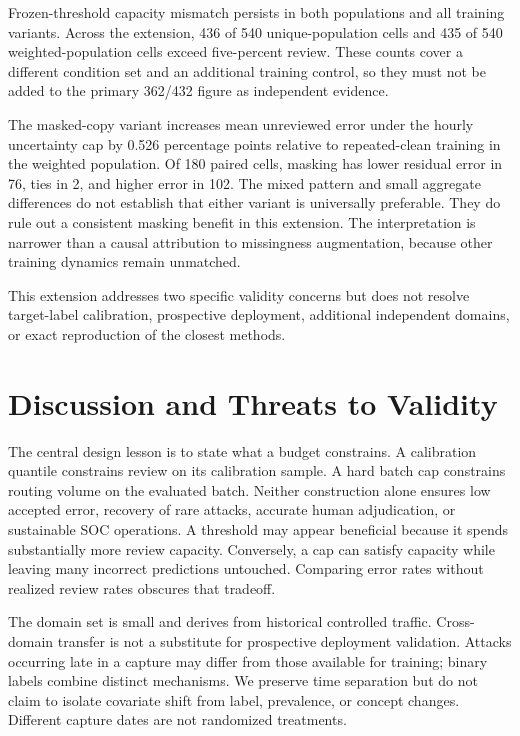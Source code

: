\documentclass[manuscript,screen,nonacm]{acmart}
\begin{document}
Frozen-threshold capacity mismatch persists in both populations and all training variants. Across the extension, 436 of 540 unique-population cells and 435 of 540 weighted-population cells exceed five-percent review. These counts cover a different condition set and an additional training control, so they must not be added to the primary 362/432 figure as independent evidence.

The masked-copy variant increases mean unreviewed error under the hourly uncertainty cap by 0.526 percentage points relative to repeated-clean training in the weighted population. Of 180 paired cells, masking has lower residual error in 76, ties in 2, and higher error in 102. The mixed pattern and small aggregate differences do not establish that either variant is universally preferable. They do rule out a consistent masking benefit in this extension. The interpretation is narrower than a causal attribution to missingness augmentation, because other training dynamics remain unmatched.

This extension addresses two specific validity concerns but does not resolve target-label calibration, prospective deployment, additional independent domains, or exact reproduction of the closest methods.

\section{Discussion and Threats to Validity}
The central design lesson is to state what a budget constrains. A calibration quantile constrains review on its calibration sample. A hard batch cap constrains routing volume on the evaluated batch. Neither construction alone ensures low accepted error, recovery of rare attacks, accurate human adjudication, or sustainable SOC operations. A threshold may appear beneficial because it spends substantially more review capacity. Conversely, a cap can satisfy capacity while leaving many incorrect predictions untouched. Comparing error rates without realized review rates obscures that tradeoff.

The domain set is small and derives from historical controlled traffic. Cross-domain transfer is not a substitute for prospective deployment validation. Attacks occurring late in a capture may differ from those available for training; binary labels combine distinct mechanisms. We preserve time separation but do not claim to isolate covariate shift from label, prevalence, or concept changes. Different capture dates are not randomized treatments.
\end{document}
